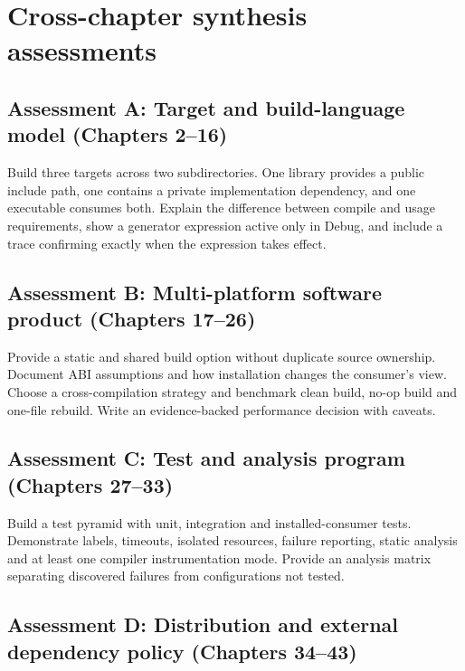 \documentclass[11pt,letterpaper,oneside]{report}
\begin{document}
\chapter{Cross-chapter synthesis
assessments}\label{cross-chapter-synthesis-assessments}

\section{Assessment A: Target and build-language model (Chapters
2--16)}\label{assessment-a-target-and-build-language-model-chapters-216}

Build three targets across two subdirectories. One library provides a
public include path, one contains a private implementation dependency,
and one executable consumes both. Explain the difference between compile
and usage requirements, show a generator expression active only in
Debug, and include a trace confirming exactly when the expression takes
effect.

\section{Assessment B: Multi-platform software product (Chapters
17--26)}\label{assessment-b-multi-platform-software-product-chapters-1726}

Provide a static and shared build option without duplicate source
ownership. Document ABI assumptions and how installation changes the
consumer's view. Choose a cross-compilation strategy and benchmark clean
build, no-op build and one-file rebuild. Write an evidence-backed
performance decision with caveats.

\section{Assessment C: Test and analysis program (Chapters
27--33)}\label{assessment-c-test-and-analysis-program-chapters-2733}

Build a test pyramid with unit, integration and installed-consumer
tests. Demonstrate labels, timeouts, isolated resources, failure
reporting, static analysis and at least one compiler instrumentation
mode. Provide an analysis matrix separating discovered failures from
configurations not tested.

\section{Assessment D: Distribution and external dependency policy
(Chapters
34--43)}\label{assessment-d-distribution-and-external-dependency-policy-chapters-3443}
\end{document}

